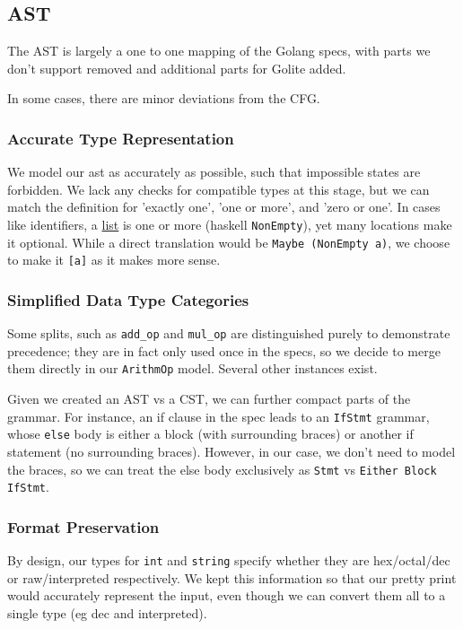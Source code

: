 \documentclass[11pt]{article}
\begin{document}
\subsection{AST}
\label{sec:org5c57c24}
The AST is largely a one to one mapping of the Golang specs, with
parts we don't support removed and additional parts for Golite added.

In some cases, there are minor deviations from the CFG.
\subsubsection{Accurate Type Representation}
\label{sec:org7b18d26}
We model our ast as accurately as possible, such that impossible
states are forbidden. We lack any checks for compatible types at
this stage, but we can match the definition for 'exactly one', 'one
or more', and 'zero or one'. In cases like identifiers, a \href{https://golang.org/ref/spec\#IdentifierList}{list} is
one or more (haskell \texttt{NonEmpty}), yet many locations make it
optional. While a direct translation would be \texttt{Maybe (NonEmpty a)},
we choose to make it \texttt{[a]} as it makes more sense.
\subsubsection{Simplified Data Type Categories}
\label{sec:org4d6118c}
Some splits, such as \texttt{add\_op} and \texttt{mul\_op} are distinguished
purely to demonstrate precedence; they are in fact only used once
in the specs, so we decide to merge them directly in our \texttt{ArithmOp}
model. Several other instances exist.

Given we created an AST vs a CST, we can further compact parts of
the grammar. For instance, an if clause in the spec leads to an
\texttt{IfStmt} grammar, whose \texttt{else} body is either a block (with
surrounding braces) or another if statement (no surrounding
braces). However, in our case, we don't need to model the braces,
so we can treat the else body exclusively as \texttt{Stmt} vs \texttt{Either
    Block IfStmt}.
\subsubsection{Format Preservation}
\label{sec:org9e01a1b}
By design, our types for \texttt{int} and \texttt{string} specify whether they
are hex/octal/dec or raw/interpreted respectively. We kept this
information so that our pretty print would accurately represent
the input, even though we can convert them all to a single type
(eg dec and interpreted).
\end{document}
